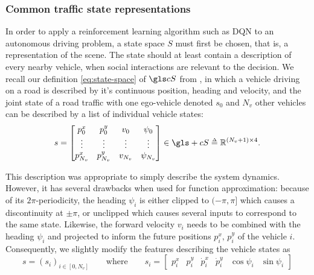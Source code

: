 \subsubsection{Common traffic state representations}

In order to apply a reinforcement learning algorithm such as \gls{DQN} to an autonomous driving problem, a state space $S$ must first be chosen, that is, a representation of the scene. The state should at least contain a description of every nearby vehicle, when social interactions are relevant to the decision. We recall our definition \eqref{eq:state-space} of $\cS$ from , in which a vehicle driving on a road is described by it's continuous position, heading and velocity, and the joint state of a road traffic with one ego-vehicle denoted $s_0$ and $N_v$ other vehicles can be described by a list of individual vehicle states:
\begin{equation*}
s = \begin{bmatrix}
p^x_0 & p^y_0 & v_0 & \psi_0\\
\vdots & \vdots & \vdots & \vdots\\
p^x_{N_v} & p^y_{N_v} & v_{N_v} & \psi_{N_v}\\
\end{bmatrix}
\in\gls+{cS} \eqdef\Real^{(N_v+1) \times 4}.
\end{equation*}

This description was appropriate to simply describe the system dynamics. However, it has several drawbacks when used for function approximation: because of its $2\pi$-periodicity, the heading $\psi_i$ is either clipped to $(-\pi, \pi]$ which causes a discontinuity at $\pm\pi$, or unclipped which causes several inputs to correspond to the same state. Likewise, the forward velocity $v_i$ needs to be combined with the heading $\psi_i$ and projected to inform the future positions $p^x_i,\,p^y_i$ of the vehicle $i$. Consequently, we slightly modify the features describing the vehicle states as
\begin{equation}
s = \left(s_i \right)_{i \in [0, N_v]}\qquad
\text{where}\qquad
s_i = \begin{bmatrix}
p^x_i & p^y_i & \dot{p}^x_i & \dot{p}^y_i & \cos\psi_i & \sin \psi_i
\end{bmatrix}
\label{eq:coordinates}
\end{equation}


